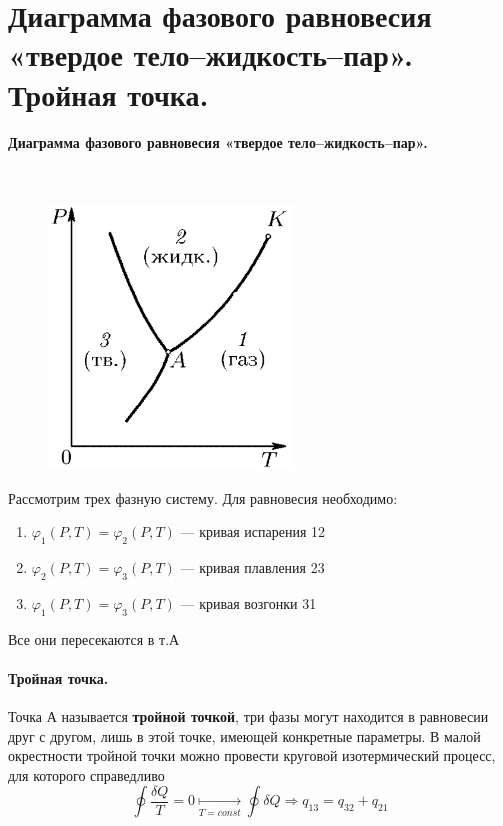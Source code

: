 \section{\normalsize Диаграмма фазового равновесия «твердое тело--жидкость--пар». Тройная точка.}
\paragraph{Диаграмма фазового равновесия «твердое тело--жидкость--пар».}$\;$\\
\begin{minipage}{75mm}
	\begin{figure}[H]
		\includegraphics[width=65mm]{ris17.png}
	\end{figure}
\end{minipage}
\begin{minipage}{100mm}
	Рассмотрим трех фазную систему. Для равновесия необходимо:
	\begin{enumerate}[(1)]
		\item $\varphi_1(P,T)=\varphi_2(P,T)$ --- кривая испарения 12
		\item $\varphi_2(P,T)=\varphi_3(P,T)$ --- кривая плавления 23
		\item $\varphi_1(P,T)=\varphi_3(P,T)$ --- кривая возгонки 31
	\end{enumerate}
	Все они пересекаются в т.А
\end{minipage}
\paragraph{Тройная точка.}
Точка А называется \textbf{тройной точкой}, три фазы могут находится в равновесии друг с другом, лишь в этой точке, имеющей конкретные параметры. В малой окрестности тройной точки можно провести круговой изотермический процесс, для которого справедливо
$$\oint\dfrac{\delta Q}{T}=0\underset{T=const}{\longmapsto}\oint\delta Q \Rightarrow q_\text{13}=q_\text{32}+q_\text{21}$$
